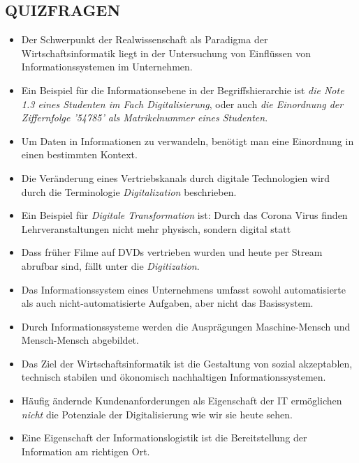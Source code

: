 \documentclass[12pt,a4paper]{article}
\begin{document}
\subsection{QUIZFRAGEN} %
\begin{itemize}
   \item Der Schwerpunkt der Realwissenschaft als Paradigma der Wirtschaftsinformatik liegt in der Untersuchung von Einflüssen von Informationssystemen im Unternehmen.
   
   \item Ein Beispiel für die Informationsebene in der Begriffshierarchie ist \emph{die Note 1.3 eines Studenten im Fach Digitalisierung}, oder auch \emph{die Einordnung der Ziffernfolge '54785' als Matrikelnummer eines Studenten}.
   \item Um Daten in Informationen zu verwandeln, benötigt man eine Einordnung in einen bestimmten Kontext.
   
   \item Die Veränderung eines Vertriebskanals durch digitale Technologien wird durch die Terminologie \emph{Digitalization} beschrieben.
   \item Ein Beispiel für \emph{Digitale Transformation} ist: Durch das Corona Virus finden Lehrveranstaltungen nicht mehr physisch, sondern digital statt
   \item Dass früher Filme auf DVDs vertrieben wurden und heute per Stream abrufbar sind, fällt unter die \emph{Digitization}.
   
   \item Das Informationssystem eines Unternehmens umfasst sowohl automatisierte als auch nicht-automatisierte Aufgaben, aber nicht das Basissystem.
   
   \item Durch Informationssysteme werden die Ausprägungen Maschine-Mensch und Mensch-Mensch abgebildet.
   
   \item Das Ziel der Wirtschaftsinformatik ist die Gestaltung von sozial akzeptablen, technisch stabilen und ökonomisch nachhaltigen Informationssystemen.
   
   \item Häufig ändernde Kundenanforderungen als Eigenschaft der IT ermöglichen \emph{nicht} die Potenziale der Digitalisierung wie wir sie heute sehen.
   
   \item Eine Eigenschaft der Informationslogistik ist die Bereitstellung der Information am richtigen Ort.
\end{itemize}
\end{document}
